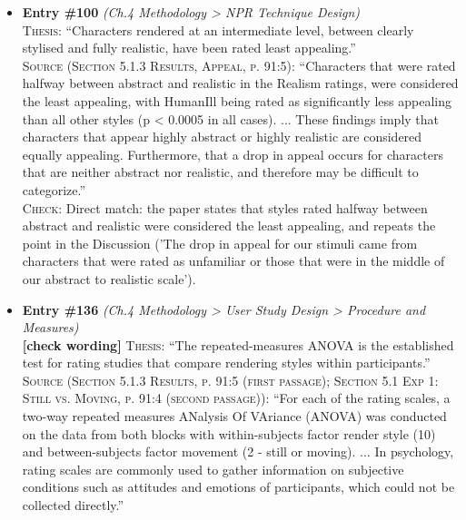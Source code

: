 \documentclass[11pt, a4paper]{article}
\begin{document}
\begin{itemize}[leftmargin=1.2em,itemsep=4pt]
\textsc{Check:} The paper does supply empirical support that highly abstract styles are appealing and that mid-range styles fall into an appeal trough, so stylisation avoids the trough. However, it explicitly counters the framing of stylisation as the principled route out of the uncanny valley: the most realistic style was rated as appealing as the cartoon styles, the authors reassure developers that realistic characters are 'not as risky as often discussed', and they note that not all abstract styles are appealing (ToonBare). Citing this paper for NPR as a principled avoidance strategy therefore takes only one half of a two-sided result.
\item \textbf{Entry \#100} \textit{(Ch.4 Methodology > NPR Technique Design)}\\
\textsc{Thesis:} ``Characters rendered at an intermediate level, between clearly stylised and fully realistic, have been rated least appealing.''\\
\textsc{Source (Section 5.1.3 Results, Appeal, p. 91:5):} ``Characters that were rated halfway between abstract and realistic in the Realism ratings, were considered the least appealing, with HumanIll being rated as significantly less appealing than all other styles (p < 0.0005 in all cases). ... These findings imply that characters that appear highly abstract or highly realistic are considered equally appealing. Furthermore, that a drop in appeal occurs for characters that are neither abstract nor realistic, and therefore may be difficult to categorize.''\\
\textsc{Check:} Direct match: the paper states that styles rated halfway between abstract and realistic were considered the least appealing, and repeats the point in the Discussion ('The drop in appeal for our stimuli came from characters that were rated as unfamiliar or those that were in the middle of our abstract to realistic scale').
\item \textbf{Entry \#136} \textit{(Ch.4 Methodology > User Study Design > Procedure and Measures)}\\
\textcolor{partialorange}{\textbf{[check wording]}} \textsc{Thesis:} ``The repeated-measures ANOVA is the established test for rating studies that compare rendering styles within participants.''\\
\textsc{Source (Section 5.1.3 Results, p. 91:5 (first passage); Section 5.1 Exp 1: Still vs. Moving, p. 91:4 (second passage)):} ``For each of the rating scales, a two-way repeated measures ANalysis Of VAriance (ANOVA) was conducted on the data from both blocks with within-subjects factor render style (10) and between-subjects factor movement (2 - still or moving). ... In psychology, rating scales are commonly used to gather information on subjective conditions such as attitudes and emotions of participants, which could not be collected directly.''\\

\end{itemize}
\end{document}
